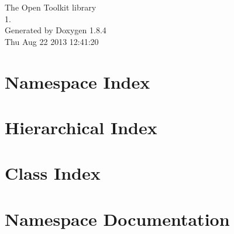 \documentclass[twoside]{book}
\newcommand{\clearemptydoublepage}{%
  \newpage{\pagestyle{empty}\cleardoublepage}%
}
\begin{document}
\hypersetup{pageanchor=false}
\begin{titlepage}
\vspace*{7cm}
\begin{center}%
{\Large The Open Toolkit library \\[1ex]\large 1. }\\
\vspace*{1cm}
{\large Generated by Doxygen 1.8.4}\\
\vspace*{0.5cm}
{\small Thu Aug 22 2013 12:41:20}\\
\end{center}
\end{titlepage}
\clearemptydoublepage
\tableofcontents
\clearemptydoublepage
{}
\hypersetup{pageanchor=true}

\chapter{Namespace Index}

\chapter{Hierarchical Index}

\chapter{Class Index}

\chapter{Namespace Documentation}


















\end{document}

